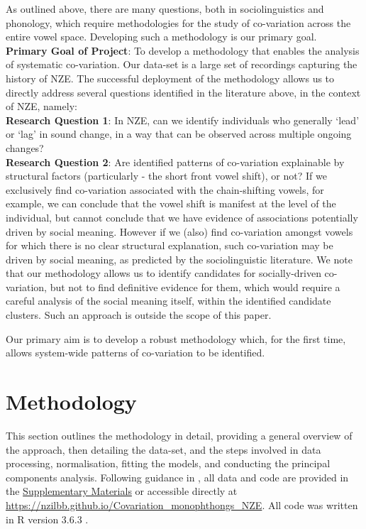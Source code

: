 \documentclass[review]{elsarticle} %
\begin{document}
As outlined above, there are many questions, both in sociolinguistics and phonology, which require methodologies for the study of co-variation across the entire vowel space.   Developing such a methodology is our primary goal.\\
{\bf Primary Goal of Project}: To develop a methodology that enables the analysis of systematic co-variation.   Our data-set is a large set of recordings capturing the history of NZE.  The successful deployment of the methodology allows us to directly address several questions identified in the literature above, in the context of NZE,  namely:  \\
{\bf Research Question 1}:  In NZE, can we identify individuals who generally `lead' or `lag' in sound change, in a way that can be observed across multiple ongoing changes?\\
{\bf Research Question 2}:  Are identified patterns of co-variation explainable by structural factors (particularly - the short front vowel shift), or not?  If we exclusively find co-variation associated with the chain-shifting vowels, for example, we can conclude that the vowel shift is manifest at the level of the individual, but cannot conclude that we have evidence of associations potentially driven by social meaning.  However if we (also) find co-variation amongst vowels for which there is no clear structural explanation, such co-variation may be driven by social meaning, as predicted by the sociolinguistic literature.   We note that our methodology allows us to identify candidates for socially-driven co-variation, but not to find definitive evidence for them, which would require a careful analysis of the social meaning itself, within the identified candidate clusters.   Such an approach is outside the scope of this paper.   

Our primary aim is to develop a robust methodology which, for the first time, allows system-wide patterns of co-variation to be identified.



\section{Methodology}\label{sec:methodology}

This section outlines the methodology in detail, providing a general overview of the approach, then detailing the data-set, and the steps involved in data processing, normalisation, fitting the models, and conducting the principal components analysis.
Following guidance in \cite{roettger2019emergent}, all data and code are provided in the \hyperref[sec:supplementarymaterials]{Supplementary Materials} or accessible directly at \url{https://nzilbb.github.io/Covariation_monophthongs_NZE}. All code was written in R version 3.6.3 \citep{R2018}.
\end{document}
